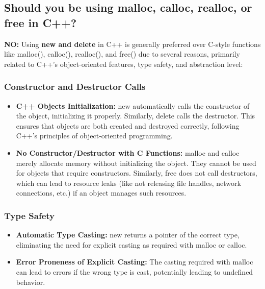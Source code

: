 \documentclass{report}
\begin{document}
\begin{concept}
    \bigbreak \noindent 
    \subsection{Should you be using malloc, calloc, realloc, or free in C++?}
    \bigbreak \noindent 
    \begin{concept}
        \textbf{NO:} Using \textbf{new and delete} in C++ is generally preferred over C-style functions like malloc(), calloc(), realloc(), and free() due to several reasons, primarily related to C++'s object-oriented features, type safety, and abstraction level:
    \end{concept}
    \bigbreak \noindent 
    \subsubsection{Constructor and Destructor Calls}
    \begin{itemize}
        \item \textbf{C++ Objects Initialization:} new automatically calls the constructor of the object, initializing it properly. Similarly, delete calls the destructor. This ensures that objects are both created and destroyed correctly, following C++'s principles of object-oriented programming.
        \item \textbf{No Constructor/Destructor with C Functions:} malloc and calloc merely allocate memory without initializing the object. They cannot be used for objects that require constructors. Similarly, free does not call destructors, which can lead to resource leaks (like not releasing file handles, network connections, etc.) if an object manages such resources.
    \end{itemize}

    \bigbreak \noindent 
    \subsubsection{Type Safety}
    \begin{itemize}
        \item \textbf{Automatic Type Casting:} new returns a pointer of the correct type, eliminating the need for explicit casting as required with malloc or calloc.
        \item \textbf{Error Proneness of Explicit Casting:} The casting required with malloc can lead to errors if the wrong type is cast, potentially leading to undefined behavior.
    \end{itemize}


\end{concept}
\end{document}
